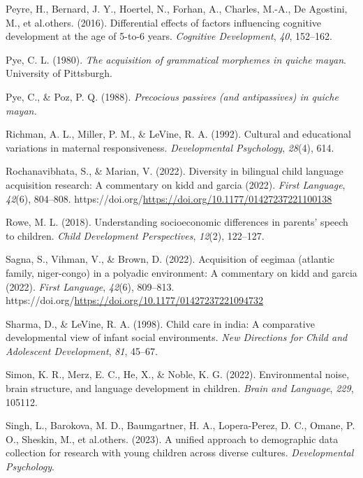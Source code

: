 \documentclass[
  man,floatsintext]{apa6}
\newlength{\cslhangindent}
\newenvironment{CSLReferences}[2] %
 {\begin{list}{}{%
  \setlength{\itemindent}{0pt}
  \setlength{\leftmargin}{0pt}
  \setlength{\parsep}{0pt}
  \ifodd #1
   \setlength{\leftmargin}{\cslhangindent}
   \setlength{\itemindent}{-1\cslhangindent}
  \fi
  \setlength{\itemsep}{#2\baselineskip}}}
 {\end{list}}
\begin{document}
\begin{CSLReferences}{1}{0}
Peyre, H., Bernard, J. Y., Hoertel, N., Forhan, A., Charles, M.-A., De Agostini, M., et al.others. (2016). Differential effects of factors influencing cognitive development at the age of 5-to-6 years. \emph{Cognitive Development}, \emph{40}, 152--162.

Pye, C. L. (1980). \emph{The acquisition of grammatical morphemes in quiche mayan}. University of Pittsburgh.

Pye, C., \& Poz, P. Q. (1988). \emph{Precocious passives (and antipassives) in quiche mayan.}

Richman, A. L., Miller, P. M., \& LeVine, R. A. (1992). Cultural and educational variations in maternal responsiveness. \emph{Developmental Psychology}, \emph{28}(4), 614.

Rochanavibhata, S., \& Marian, V. (2022). Diversity in bilingual child language acquisition research: A commentary on kidd and garcia (2022). \emph{First Language}, \emph{42}(6), 804--808. https://doi.org/\url{https://doi.org/10.1177/01427237221100138}

Rowe, M. L. (2018). Understanding socioeconomic differences in parents' speech to children. \emph{Child Development Perspectives}, \emph{12}(2), 122--127.

Sagna, S., Vihman, V., \& Brown, D. (2022). Acquisition of eegimaa (atlantic family, niger-congo) in a polyadic environment: A commentary on kidd and garcia (2022). \emph{First Language}, \emph{42}(6), 809--813. https://doi.org/\url{https://doi.org/10.1177/01427237221094732}

Sharma, D., \& LeVine, R. A. (1998). Child care in india: A comparative developmental view of infant social environments. \emph{New Directions for Child and Adolescent Development}, \emph{81}, 45--67.

Simon, K. R., Merz, E. C., He, X., \& Noble, K. G. (2022). Environmental noise, brain structure, and language development in children. \emph{Brain and Language}, \emph{229}, 105112.

Singh, L., Barokova, M. D., Baumgartner, H. A., Lopera-Perez, D. C., Omane, P. O., Sheskin, M., et al.others. (2023). A unified approach to demographic data collection for research with young children across diverse cultures. \emph{Developmental Psychology}.


\end{CSLReferences}
\end{document}
